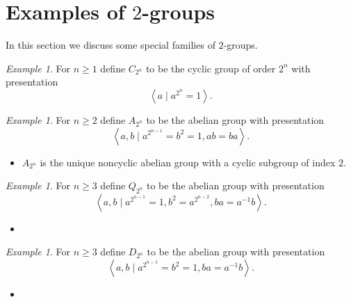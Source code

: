\documentclass{dcthesis}
\newcommand{\defi}[1]{\textsf{#1}}
\theoremstyle{definition}
\theoremstyle{remark}
\newtheorem{example}[prop]{Example}
\numberwithin{equation}{section}
\numberwithin{figure}{section}
\begin{document}
{  \section{Examples of $2$-groups}{\label{sec:twogroupexamples}
    In this section we discuss some special families of $2$-groups.
    \begin{example}
      \label{exm:cyclic}
      For $n\geq 1$ define
      $C_{2^n}$ to be the \defi{cyclic group of order $2^n$}
      with presentation
      \[
        \left\langle
          a\mid
          a^{2^n}=1
        \right\rangle.
      \]
    \end{example}
    \begin{example}
      \label{exm:abeliannoncyclic}
      For $n\geq 2$ define
      $A_{2^n}$ to be the
      abelian group
      with presentation
      \[
        \left\langle
          a, b\mid
          a^{2^{n-1}}=b^2=1,
          ab=ba
        \right\rangle.
      \]
      \begin{itemize}
        \item
          $A_{2^n}$ is the unique noncyclic abelian group
          with a cyclic subgroup of index $2$.
      \end{itemize}
    \end{example}
    \begin{example}
      \label{exm:generalizedquaternion}
      For $n\geq 3$ define
      $Q_{2^n}$ to be the
      abelian group
      with presentation
      \[
        \left\langle
          a,b\mid
          a^{2^{n-1}}=1,
          b^2=a^{2^{n-2}},
          ba=a^{-1}b
        \right\rangle.
      \]
      \begin{itemize}
        \item
      \end{itemize}
    \end{example}
    \begin{example}
      \label{exm:dihedralgroup}
      For $n\geq 3$ define
      $D_{2^n}$ to be the
      abelian group
      with presentation
      \[
        \left\langle
          a,b\mid
          a^{2^{n-1}}=
          b^2=1,
          ba=a^{-1}b
        \right\rangle.
      \]
      \begin{itemize}
        \item

\end{itemize}
\end{example}}}
\end{document}
